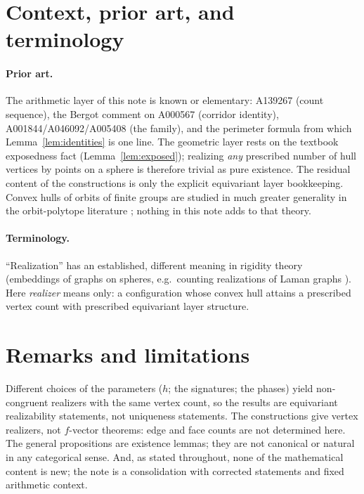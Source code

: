 \documentclass[11pt]{article}
\theoremstyle{definition}
\theoremstyle{remark}
\begin{document}
\section{Context, prior art, and terminology}\label{sec:context}

\paragraph{Prior art.} The arithmetic layer of this note is known or
elementary: A139267 (count sequence), the Bergot comment on A000567
(corridor identity), A001844/A046092/A005408 (the family), and the
perimeter formula from which Lemma~\ref{lem:identities} is one line. The
geometric layer rests on the textbook exposedness fact
(Lemma~\ref{lem:exposed}); realizing \emph{any} prescribed number of hull
vertices by points on a sphere is therefore trivial as pure existence. The
residual content of the constructions is only the explicit equivariant
layer bookkeeping. Convex hulls of orbits of finite groups are studied in
much greater generality in the orbit-polytope literature
\cite{frieseladisch,matteo}; nothing in this note adds to that theory.

\paragraph{Terminology.} ``Realization'' has an established, different
meaning in rigidity theory (embeddings of graphs on spheres, e.g.\
counting realizations of Laman graphs \cite{laman}). Here \emph{realizer}
means only: a configuration whose convex hull attains a prescribed vertex
count with prescribed equivariant layer structure.

\section{Remarks and limitations}\label{sec:limits}

Different choices of the parameters ($h$; the signatures; the phases) yield
non-congruent realizers with the same vertex count, so the results are
equivariant realizability statements, not uniqueness statements. The
constructions give vertex realizers, not $f$-vector theorems: edge and face
counts are not determined here. The general propositions are existence
lemmas; they are not canonical or natural in any categorical sense. And, as
stated throughout, none of the mathematical content is new; the note is a
consolidation with corrected statements and fixed arithmetic context.
\end{document}
